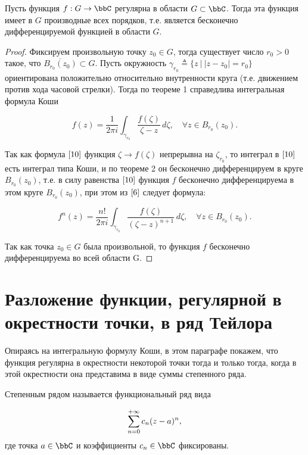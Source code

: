 \begin{thm} \label{T3}

Пусть функция $f : G \to \bbC$ регулярна в области $G \subset \bbC$. Тогда эта функция имеет в $G$ производные всех порядков, т.е. является бесконечно дифференцируемой функцией в области $G$.

\end{thm}
\begin{proof}
Фиксируем произвольную точку $z_0 \in G$, тогда существует число $r_0 > 0$ такое, что $\overline{B_{r_0}(z_0)}\subset G$. Пусть окружность $\gamma_{r_0} \triangleq \{ z \: \bigl| \: |z - z_0| = r_0 \}$ ориентирована положительно относительно внутренности круга (т.е. движением против хода часовой стрелки). Тогда по теореме 1 справедлива интегральная формула Коши

\begin{equation} \label{10}
f(z) = \frac{1}{2\pi i} \int_{\gamma_{r_0}} \frac{f(\zeta)}{\zeta - z} \,d\zeta, \quad \forall z \in B_{r_0}(z_0).
\end{equation}

Так как формула $\eqref{10}$ функция $\zeta \to f(\zeta)$ непрерывна на $\zeta_{r_0}$, то интеграл в $\eqref{10}$ есть интеграл типа Коши, и по теореме 2 он бесконечно дифференцируем в круге $B_{r_0}(z_0)$, т.е. в силу равенства $\eqref{10}$ функция $f$ бесконечно дифференцируема в этом круге $B_{r_0}(z_0)$, при этом из $\eqref{6}$ следует формула:

\begin{equation} \label{11}
f^{n}(z) = \frac{n!}{2\pi i} \int_{\gamma_{r_0}} \frac{f(\zeta)}{(\zeta - z)^{n+1}}\,d\zeta, \quad \forall z \in B_{r_0}(z_0).
\end{equation}


Так как точка $z_0 \in G$ была произвольной, то функция $f$ бесконечно дифференцируема во всей области G.
\end{proof}
\section{Разложение функции, регулярной в окрестности точки, в ряд Тейлора}

Опираясь на интегральную формулу Коши, в этом параграфе покажем, что функция регулярна в окрестности некоторой точки тогда и только тогда, когда в этой окрестности она представима в виде суммы степенного ряда.

\begin{defn}
$\textit{Степенным рядом}$ называется функциональный ряд вида

\begin{equation} \label{1}
\sum_{n = 0}^{+\infty}\limits c_n (z - a)^n,
\end{equation}
где точка $a \in \bbC$ и коэффициенты $c_n \in \bbC$ фиксированы.
\end{defn}

